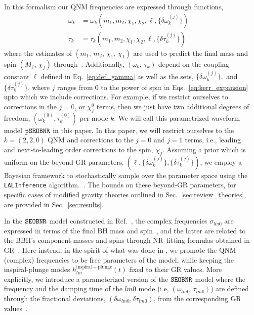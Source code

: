 In this formalism our QNM frequencies are expressed through functions,
%
\begin{subequations}
\begin{align}
\omega_k &= \omega_k(m_1, m_2, \chi_1, \chi_2,\ell, \{\delta \omega_k^{(j)}\})\\
\tau_k   &= \tau _k(m_1, m_2, \chi_1, \chi_2, \ell, \{\delta \tau_k^{(j)}\})
\end{align}
\end{subequations}
%
where the estimates of $(m_1,\, m_2,\, \chi_1,\, \chi_1)$ are used to predict the final mass and spin $(M_f,\, \chi_f)$ through~\cite{Taracchini:2013rva,Hofmann:2016yih}.
%
Additionally, $(\omega_k,\, \tau_k)$ depend on the coupling constant $\ell$ defined in Eq.~\eqref{eq:def_gamma} as well as the sets, $\{\delta \omega_k^{(j)}\},$ and $\{\delta \tau_k^{(j)}\}$, where $j$ ranges from 0 to the power of spin in Eqs.~\ref{eq:kerr_expansion} upto which we include corrections.
%
For example, if we restrict ourselves to corrections in the $j=0$, or $\chi_f^0$ terms, then we just have two additional degrees of freedom, $(\omega_k^{(0)}, \tau_k^{(0)})$ per mode $k$. We will call this parametrized waveform model $\texttt{pSEOBNR}$ in this paper.
%
In this paper, we will restrict ourselves to the $k=(2,2,0)$ QNM and corrections to the $j=0$ and $j=1$ terms, i.e., leading and next-to-leading order corrections to the spin, $\chi_f$. Assuming a prior which is uniform on the beyond-GR parameters, $(\ell, \{\delta \omega_k^{(j)}\},\{\delta \tau_k^{(j)}\})$, we employ a Bayesian framework to stochastically sample over the parameter space using the \texttt{LALInference} algorithm.~\cite{lallsuite}.
%
The bounds on these beyond-GR parameters, for specific cases of modified gravity theories outlined in Sec.~\ref{sec:review_theories}, are provided in Sec.~\ref{sec:results}.




\iffalse
In the $\texttt{SEOBNR}$ model constructed in Ref.~\cite{Cotesta:2018fcv}, the
complex frequencies $\sigma_{l m 0}$ are expressed in terms of the
final BH mass and spin~\cite{Berti:2005ys,Berti:2009kk}, and the
latter are related to the BBH's component masses and spins through
NR--fitting-formulas obtained in
GR~\cite{Taracchini:2013rva,Hofmann:2016yih}. Here instead, in the
spirit of what was done in \paperone, we promote the QNM (complex)
frequencies to be free parameters of the model, while keeping the
inspiral-plunge modes $h_{l m}^\mathrm{inspiral-plunge}(t)$ fixed
to their GR values. More explicitly, we introduce a parameterized
version of the $\texttt{SEOBNR}$ model where the frequency and the
damping time of the ${l m 0}$ mode (i.e, $(\omega_{l m 0}, \tau
_{l m 0})$) are defined through the fractional deviations, $(\delta
\omega_{l m 0},\delta \tau_{l m 0})$, from the corresponding GR
values~\cite{Gossan:2011ha,Meidam:2014jpa}.


